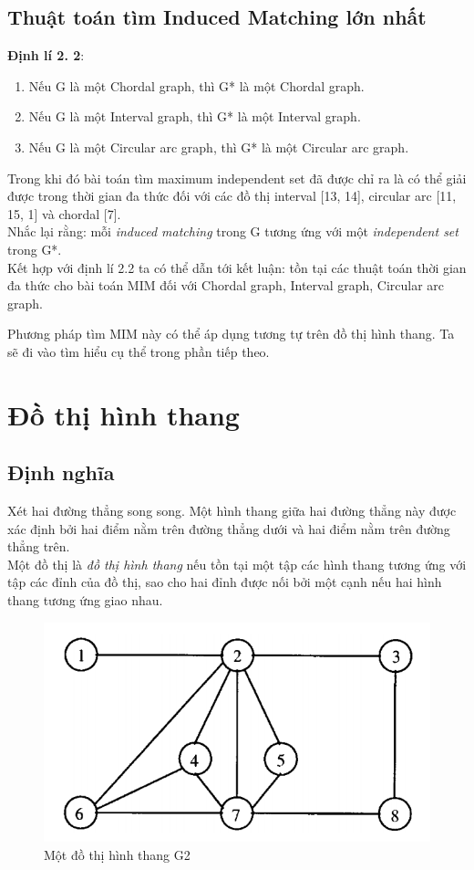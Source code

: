 \documentclass[14pt,a4paper]{extreport}
\begin{document}
\section{Thuật toán tìm Induced Matching lớn nhất}

\textbf{Định lí 2. 2}: 
\begin{enumerate}
	\item Nếu G là một Chordal graph, thì G* là một Chordal graph.
	\item Nếu G là một Interval graph, thì G* là một Interval graph.
	\item Nếu G là một Circular arc graph, thì G* là một Circular arc graph.
\end{enumerate}
	
Trong khi đó bài toán tìm maximum independent set đã được chỉ ra là có thể giải được trong thời gian đa thức đối với các đồ thị interval [13, 14], circular arc [11, 15, 1] và chordal [7]. \\
Nhắc lại rằng: mỗi \textit{induced matching} trong G tương ứng với một \textit{independent set} trong G*.\\
 Kết hợp với định lí 2.2 ta có thể dẫn tới kết luận: tồn tại các thuật toán thời gian đa thức cho bài toán MIM đối với Chordal graph, Interval graph, Circular arc graph.

Phương pháp tìm MIM này có thể áp dụng tương tự trên đồ thị hình thang. Ta sẽ đi vào tìm hiểu cụ thể trong phần tiếp theo.


\chapter{Đồ thị hình thang}
\section{Định nghĩa}

Xét hai đường thẳng song song. Một hình thang giữa hai đường thẳng này được xác định bởi hai điểm nằm trên đường thẳng dưới và hai điểm nằm trên đường thẳng trên.\\
 Một đồ thị là \textit{đồ thị hình thang} nếu tồn tại một tập các hình thang tương ứng với tập các đỉnh của đồ thị, sao cho hai đỉnh được nối bởi một cạnh nếu hai hình thang tương ứng giao nhau. 

\begin{figure}
	\centering
	\includegraphics[scale=.5]{trapezoid}
	\caption{Một đồ thị hình thang G2}
\end{figure}
\end{document}
